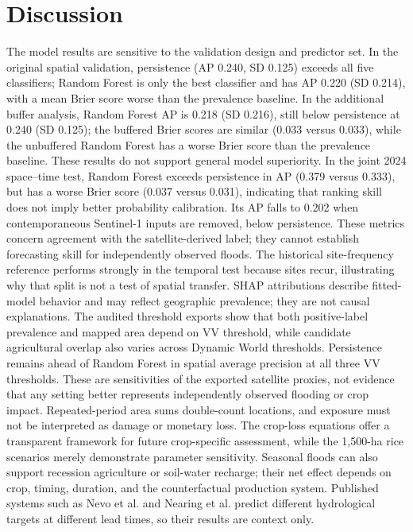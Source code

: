 \documentclass[pdflatex,sn-mathphys,Numbered]{sn-jnl}
\begin{document}
\section{Discussion}
The model results are sensitive to the validation design and predictor set. In the original spatial validation, persistence (AP 0.240, SD 0.125) exceeds all five classifiers; Random Forest is only the best classifier and has AP 0.220 (SD 0.214), with a mean Brier score worse than the prevalence baseline. In the additional buffer analysis, Random Forest AP is 0.218 (SD 0.216), still below persistence at 0.240 (SD 0.125); the buffered Brier scores are similar (0.033 versus 0.033), while the unbuffered Random Forest has a worse Brier score than the prevalence baseline. These results do not support general model superiority. In the joint 2024 space--time test, Random Forest exceeds persistence in AP (0.379 versus 0.333), but has a worse Brier score (0.037 versus 0.031), indicating that ranking skill does not imply better probability calibration. Its AP falls to 0.202 when contemporaneous Sentinel-1 inputs are removed, below persistence. These metrics concern agreement with the satellite-derived label; they cannot establish forecasting skill for independently observed floods. The historical site-frequency reference performs strongly in the temporal test because sites recur, illustrating why that split is not a test of spatial transfer. SHAP attributions describe fitted-model behavior and may reflect geographic prevalence; they are not causal explanations. The audited threshold exports show that both positive-label prevalence and mapped area depend on VV threshold, while candidate agricultural overlap also varies across Dynamic World thresholds. Persistence remains ahead of Random Forest in spatial average precision at all three VV thresholds. These are sensitivities of the exported satellite proxies, not evidence that any setting better represents independently observed flooding or crop impact. Repeated-period area sums double-count locations, and exposure must not be interpreted as damage or monetary loss. The crop-loss equations offer a transparent framework for future crop-specific assessment, while the 1,500-ha rice scenarios merely demonstrate parameter sensitivity. Seasonal floods can also support recession agriculture or soil-water recharge; their net effect depends on crop, timing, duration, and the counterfactual production system. Published systems such as Nevo et al. and Nearing et al. predict different hydrological targets at different lead times, so their results are context only.
\end{document}
